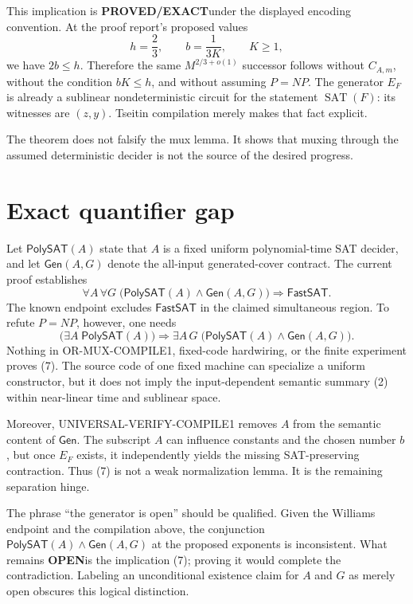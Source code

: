 \documentclass[11pt]{article}
\newcommand{\SAT}{\operatorname{SAT}}
\newcommand{\EXACT}{\textcolor{exact}{\textbf{PROVED/EXACT}}}
\newcommand{\OPEN}{\textcolor{openstatus}{\textbf{OPEN}}}
\begin{document}
This implication is \EXACT under the displayed encoding convention.  At the
proof report's proposed values
\[
 h=\frac23,\qquad b=\frac{1}{3K},\qquad K\ge1,
\]
we have $2b\le h$.  Therefore the same $M^{2/3+o(1)}$ successor follows
without $C_{A,m}$, without the condition $bK\le h$, and without assuming
$P=NP$.  The generator $E_F$ is already a sublinear nondeterministic circuit
for the statement $\SAT(F)$: its witnesses are $(z,y)$.  Tseitin compilation
merely makes that fact explicit.

The theorem does not falsify the mux lemma.  It shows that muxing through the
assumed deterministic decider is not the source of the desired progress.

\section{Exact quantifier gap}

Let $\mathsf{PolySAT}(A)$ state that $A$ is a fixed uniform polynomial-time
SAT decider, and let $\mathsf{Gen}(A,G)$ denote the all-input generated-cover
contract.  The current proof establishes
\[
 \forall A\,\forall G\;
 \bigl(\mathsf{PolySAT}(A)\wedge\mathsf{Gen}(A,G)\bigr)
 \Longrightarrow \mathsf{FastSAT}.                     \tag{6}
\]
The known endpoint excludes $\mathsf{FastSAT}$ in the claimed simultaneous
region.  To refute $P=NP$, however, one needs
\[
 \bigl(\exists A\;\mathsf{PolySAT}(A)\bigr)
 \Longrightarrow
 \exists A\,G\;
 \bigl(\mathsf{PolySAT}(A)\wedge\mathsf{Gen}(A,G)\bigr).\tag{7}
\]
Nothing in OR-MUX-COMPILE1, fixed-code hardwiring, or the finite experiment
proves (7).  The source code of one fixed machine can specialize a uniform
constructor, but it does not imply the input-dependent semantic summary (2)
within near-linear time and sublinear space.

Moreover, UNIVERSAL-VERIFY-COMPILE1 removes $A$ from the semantic content of
$\mathsf{Gen}$.  The subscript $A$ can influence constants and the chosen
number $b$, but once $E_F$ exists, it independently yields the missing
SAT-preserving contraction.  Thus (7) is not a weak normalization lemma.  It
is the remaining separation hinge.

The phrase ``the generator is open'' should be qualified.  Given the
Williams endpoint and the compilation above, the conjunction
$\mathsf{PolySAT}(A)\wedge\mathsf{Gen}(A,G)$ at the proposed exponents is
inconsistent.  What remains \OPEN is the implication (7); proving it would
complete the contradiction.  Labeling an unconditional existence claim for
$A$ and $G$ as merely open obscures this logical distinction.
\end{document}
